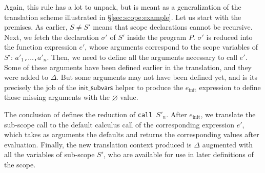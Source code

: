 \documentclass[11pt,a4paper]{article}
\newcommand{\sref}[1]{\S\ref{sec:#1}}
\newcommand{\synvar}[1]{\ensuremath{#1}}
\newcommand{\synkeyword}[1]{\textcolor{red!60!black}{\texttt{#1}}}
\newcommand{\synpunct}[1]{\textcolor{black!40!white}{\texttt{#1}}}
\newcommand{\syncall}{\synkeyword{call~}}
\newcommand{\synemptydefault}{\synvar{\varnothing}}
\newcommand{\synellipsis}{\synpunct{,$\ldots$,}}
\newcommand{\redctx}[1]{\textcolor{green!50!black}{\ensuremath{#1}}}
\newcommand{\redinit}{\redctx{\mathsf{init\_subvars}}}
\begin{document}
Again, this rule has a lot to unpack, but is meant as a generalization of the 
translation scheme illustrated in \sref{scope:example}. Let us start with 
the premises. As earlier, $S\neq S'$ means that scope declarations cannot be 
recursive. Next, we fetch the declaration \synvar{\sigma'} of \synvar{S'} inside 
the program $P$. \synvar{\sigma'} is reduced into the function expression \synvar{e'},
whose arguments correspond to the scope variables of \synvar{S'}: 
\synvar{a'_1}\synellipsis\synvar{a'_n}. Then, we need to define all the arguments 
necessary to call \synvar{e'}. Some of these arguments have been defined earlier 
in the translation, and they were added to \redctx{\Delta}. But some arguments 
may not have been defined yet, and is its precisely the job of the \redinit{} 
helper to produce the \synvar{e_\mathrm{init}} expression to define those 
missing arguments with the \synemptydefault{} value.

The conclusion of  defines the reduction of 
\syncall$\synvar{S'}_\synvar{n}$. After \synvar{e_\mathrm{init}},
we translate the sub-scope call to the default calculus call of the corresponding expression \synvar{e'},
which takes as arguments the defaults and returns the corresponding values after 
evaluation. Finally, the new translation context produced is \redctx{\Delta}
augmented with all the variables of sub-scope \synvar{S'}, who are available 
for use in later definitions of the scope.
\end{document}
